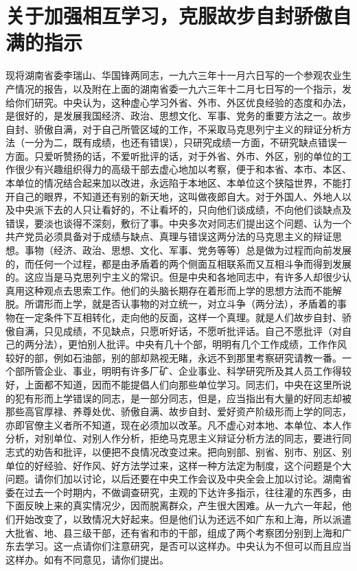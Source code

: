 \section[关于加强相互学习，克服故步自封骄傲自满的指示（一九六三年十二月十三日）]{关于加强相互学习，克服故步自封骄傲自满的指示}


现将湖南省委李瑞山、华国锋两同志，一九六三年十一月六日写的一个参观农业生产情况的报告，以及附在上面的湖南省委一九六三年十二月七日写的一个指示，发给你们研究。中央认为，这种虚心学习外省、外市、外区优良经验的态度和办法，是很好的，是发展我国经济、政治、思想文化、军事、党务的重要方法之一。故步自封、骄傲自满，对于自己所管区域的工作，不采取马克思列宁主义的辩证分析方法（一分为二，既有成绩，也还有错误），只研究成绩一方面，不研究缺点错误一方面。只爱听赞扬的话，不爱听批评的话，对于外省、外市、外区，别的单位的工作很少有兴趣组织得力的高级干部去虚心地加以考察，便于和本省、本市、本区、本单位的情况结合起来加以改进，永远陷于本地区、本单位这个狭隘世界，不能打开自己的眼界，不知道还有别的新天地，这叫做夜郎自大。对于外国人、外地人以及中央派下去的人只让看好的，不让看坏的，只向他们谈成绩，不向他们谈缺点及错误，要淡也谈得不深刻，敷衍了事。中央多次对同志们提出这个问题、认为一个共产党员必须具备对于成绩与缺点、真理与错误这两分法的马克思主义的辩证思想。事物（经济、政治、思想、文化、军事、党务等等）总是做为过程而向前发展的，而任何一个过程，都是由矛盾着的两个侧面互相联系而又互相斗争而得到发展的。这应当是马克思列宁主义的常识。但是中央和各地同志中，有许多人却很少认真用这种观点去思索工作。他们的头脑长期存在着形而上学的思想方法而不能解脱。所谓形而上学，就是否认事物的对立统一，对立斗争（两分法），矛盾着的事物在一定条件下互相转化，走向他的反面，这样一个真理。就是人们故步自封、骄傲自满，只见成绩，不见缺点，只愿听好话，不愿听批评话。自己不愿批评（对自己的两分法），更怕别人批评。中央有几十个部，明明有几个工作成绩，工作作风较好的部，例如石油部，别的部却熟视无睹，永远不到那里考察研究请教一番。一个部所管企业、事业，明明有许多厂矿、企业事业、科学研究所及其人员工作得较好，上面都不知道，因而不能提倡人们向那些单位学习。同志们，中央在这里所说的犯有形而上学错误的同志，是一部分同志，但是，应当指出有大量的好同志却被那些高官厚禄、养尊处优、骄傲自满、故步自封、爱好资产阶级形而上学的同志，亦即官僚主义者所不知道，现在必须加以改革。凡不虚心对本地、本单位、本人作分析，对别单位、对别人作分析，拒绝马克思主义辩证分析方法的同志，要进行同志式的劝告和批评，以便把不良情况改变过来。把向别部、别省、别市、别区、别单位的好经验、好作风、好方法学过来，这样一种方法定为制度，这个问题是个大问题。请你们加以讨论，以后还要在中央工作会议及中央全会上加以讨论。湖南省委在过去一个时期内，不做调查研究，主观的下达许多指示，往往灌的东西多，由下面反映上来的真实情况少，因而脱离群众，产生很大困难。从一九六一年起，他们开始改变了，以致情况大好起来。但是他们认为还远不如广东和上海，所以派遣大批省、地、县三级干部，还有省和市的干部，组成了两个考察团分别到上海和广东去学习。这一点请你们注意研究，是否可以这样办。中央认为不但可以而且应当这样办。如有不同意见，请你们提出。



